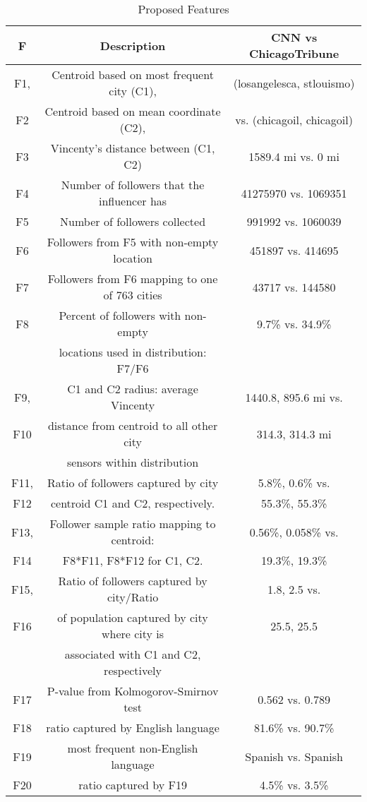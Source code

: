 \begin{table}
\small
\caption{Proposed Features}
\label{table_4_2}
\begin{center}
\tabcolsep=0.1cm
\begin{tabular}{|c|c|c|}
\hline
\bfseries F & \bfseries Description & \bfseries CNN vs ChicagoTribune\\
\hline
F1,&Centroid based on most frequent city (C1), &(losangelesca, stlouismo)\\
F2&Centroid based on mean coordinate (C2),& vs. (chicagoil, chicagoil)\\
\hline
F3&Vincenty's distance between (C1, C2)&1589.4 mi vs. 0 mi\\
\hline
F4&Number of followers that the influencer has&41275970 vs. 1069351\\
\hline
F5&Number of followers collected&991992 vs. 1060039\\
\hline
F6&Followers from F5 with non-empty location&451897 vs. 414695\\
\hline
F7&Followers from F6 mapping to one of 763 cities&43717 vs. 144580\\
\hline
F8&Percent of followers with non-empty &9.7\% vs. 34.9\%\\
&locations used in distribution: F7/F6&\\
\hline
F9, &C1 and C2 radius: average Vincenty &1440.8, 895.6 mi vs. \\
F10&distance from centroid to all other city&314.3, 314.3 mi\\
&sensors within distribution&\\
\hline
F11, &Ratio of followers captured by city &5.8\%, 0.6\% vs. \\
F12&centroid C1 and C2, respectively.&55.3\%, 55.3\%\\
\hline
F13, &Follower sample ratio mapping to centroid:&0.56\%, 0.058\% vs. \\
F14&F8*F11, F8*F12 for C1, C2.&19.3\%, 19.3\%\\
\hline
F15, &Ratio of followers captured by city/Ratio &1.8, 2.5 vs. \\
F16&of population captured by city where city is&25.5, 25.5\\
&associated with C1 and C2, respectively&\\
\hline
F17&P-value from Kolmogorov-Smirnov test &0.562 vs. 0.789\\
\hline
F18&ratio captured by English language&81.6\% vs. 90.7\%\\
\hline
F19&most frequent non-English language&Spanish vs. Spanish\\
\hline
F20&ratio captured by F19&4.5\% vs. 3.5\%\\
\hline
\end{tabular}
\end{center}
\end{table}



